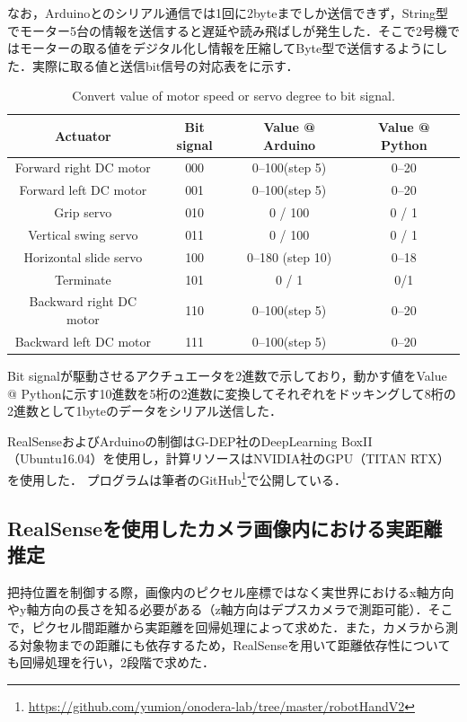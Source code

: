 なお，Arduinoとのシリアル通信では1回に2byteまでしか送信できず，String型でモーター5台の情報を送信すると遅延や読み飛ばしが発生した．そこで2号機ではモーターの取る値をデジタル化し情報を圧縮してByte型で送信するようにした．実際に取る値と送信bit信号の対応表をに示す．

\begin{table}
    \centering
    \caption{Convert value of motor speed or servo degree to bit signal.}
    \begin{tabular}{cccc}\toprule
        Actuator & Bit signal & Value @ Arduino & Value @ Python \\ \midrule
        Forward right DC motor & 000 & 0--100(step 5) & 0--20  \\ 
        Forward left DC motor & 001 & 0--100(step 5) & 0--20 \\ 
        Grip servo & 010 & 0 / 100 & 0 / 1\\ 
        Vertical swing servo & 011 & 0 / 100 & 0 / 1\\ 
        Horizontal slide servo & 100 & 0--180 (step 10) & 0--18 \\ 
        Terminate & 101 & 0 / 1 & 0/1 \\ 
        Backward right DC motor & 110 & 0--100(step 5) & 0--20 \\ 
        Backward left DC motor & 111 & 0--100(step 5) & 0--20 \\ \bottomrule
    \end{tabular} 
    \label{tab:2号機信号表}
\end{table}

Bit signalが駆動させるアクチュエータを2進数で示しており，動かす値をValue @ Pythonに示す10進数を5桁の2進数に変換してそれぞれをドッキングして8桁の2進数として1byteのデータをシリアル送信した．

RealSenseおよびArduinoの制御はG-DEP社のDeepLearning BoxII（Ubuntu16.04）を使用し，計算リソースはNVIDIA社のGPU（TITAN RTX）を使用した．
プログラムは筆者のGitHub\footnote{\url{https://github.com/yumion/onodera-lab/tree/master/robotHandV2}}で公開している．


\subsection{RealSenseを使用したカメラ画像内における実距離推定}
把持位置を制御する際，画像内のピクセル座標ではなく実世界におけるx軸方向やy軸方向の長さを知る必要がある（z軸方向はデプスカメラで測距可能）．そこで，ピクセル間距離から実距離を回帰処理によって求めた．また，カメラから測る対象物までの距離にも依存するため，RealSenseを用いて距離依存性についても回帰処理を行い，2段階で求めた．

